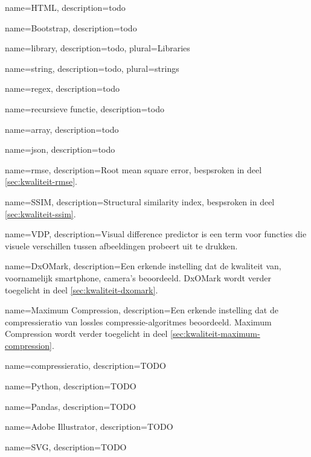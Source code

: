 {
	name={HTML},
	description={todo}
}

{
	name={Bootstrap},
	description={todo}
}

{
	name={library},
	description={todo},
	plural={Libraries}
}

{
	name={string},
	description={todo},
	plural={strings}
}

{
	name={regex},
	description={todo}
}

{
	name={recursieve functie},
	description={todo}
}

{
	name={array},
	description={todo}
}

{
	name={json},
	description={todo}
}

{
	name={rmse},
	description={Root mean square error, bespsroken in deel \ref{sec:kwaliteit-rmse}.}
}

{
	name={SSIM},
	description={Structural similarity index, bespsroken in deel \ref{sec:kwaliteit-ssim}.}
}

{
	name={VDP},
	description={Visual difference predictor is een term voor functies die visuele verschillen tussen afbeeldingen probeert uit te drukken.}
}

{
	name={DxOMark},
	description={Een erkende instelling dat de kwaliteit van, voornamelijk smartphone, camera's beoordeeld. DxOMark wordt verder toegelicht in deel \ref{sec:kwaliteit-dxomark}.}
}

{
	name={Maximum Compression},
	description={Een erkende instelling dat de compressieratio van lossles compressie-algoritmes beoordeeld. Maximum Compression wordt verder toegelicht in deel \ref{sec:kwaliteit-maximum-compression}.}
}

{
	name={compressieratio},
	description={TODO}
}

{
	name={Python},
	description={TODO}
}

{
	name={Pandas},
	description={TODO}
}

{
	name={Adobe Illustrator},
	description={TODO}
}

{
	name={SVG},
	description={TODO}
}

